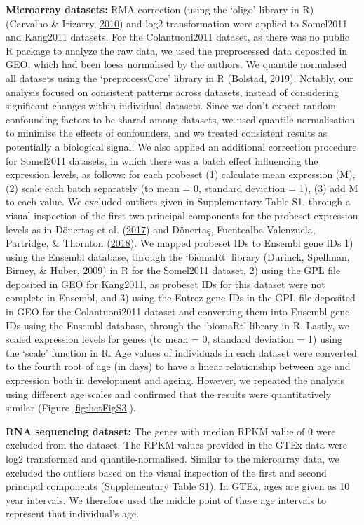\documentclass[12pt,twoside]{unicam}
\begin{document}
\textbf{Microarray datasets:} RMA correction (using the `oligo' library in R) (Carvalho \& Irizarry, \protect\hyperlink{ref-Carvalho2010}{2010}) and log2 transformation were applied to Somel2011 and Kang2011 datasets. For the Colantuoni2011 dataset, as there was no public R package to analyze the raw data, we used the preprocessed data deposited in GEO, which had been loess normalised by the authors. We quantile normalised all datasets using the `preprocessCore' library in R (Bolstad, \protect\hyperlink{ref-Bolstad2019}{2019}). Notably, our analysis focused on consistent patterns across datasets, instead of considering significant changes within individual datasets. Since we don't expect random confounding factors to be shared among datasets, we used quantile normalisation to minimise the effects of confounders, and we treated consistent results as potentially a biological signal. We also applied an additional correction procedure for Somel2011 datasets, in which there was a batch effect influencing the expression levels, as follows: for each probeset (1) calculate mean expression (M), (2) scale each batch separately (to mean = 0, standard deviation = 1), (3) add M to each value. We excluded outliers given in Supplementary Table S1, through a visual inspection of the first two principal components for the probeset expression levels as in Dönertaş et al. (\protect\hyperlink{ref-Donertas2017}{2017}) and Dönertaş, Fuentealba Valenzuela, Partridge, \& Thornton (\protect\hyperlink{ref-Donertas2018}{2018}). We mapped probeset IDs to Ensembl gene IDs 1) using the Ensembl database, through the `biomaRt' library (Durinck, Spellman, Birney, \& Huber, \protect\hyperlink{ref-Durinck2009}{2009}) in R for the Somel2011 dataset, 2) using the GPL file deposited in GEO for Kang2011, as probeset IDs for this dataset were not complete in Ensembl, and 3) using the Entrez gene IDs in the GPL file deposited in GEO for the Colantuoni2011 dataset and converting them into Ensembl gene IDs using the Ensembl database, through the `biomaRt' library in R. Lastly, we scaled expression levels for genes (to mean = 0, standard deviation = 1) using the `scale' function in R. Age values of individuals in each dataset were converted to the fourth root of age (in days) to have a linear relationship between age and expression both in development and ageing. However, we repeated the analysis using different age scales and confirmed that the results were quantitatively similar (Figure \ref{fig:hetFigS3}).

\textbf{RNA sequencing dataset:} The genes with median RPKM value of 0 were excluded from the dataset. The RPKM values provided in the GTEx data were log2 transformed and quantile-normalised. Similar to the microarray data, we excluded the outliers based on the visual inspection of the first and second principal components (Supplementary Table S1). In GTEx, ages are given as 10 year intervals. We therefore used the middle point of these age intervals to represent that individual's age.
\end{document}
